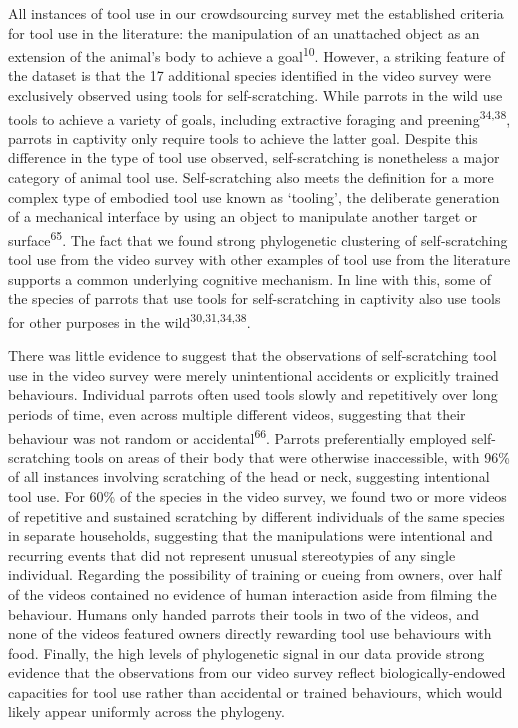 \documentclass[
  man,floatsintext]{apa6}
\begin{document}
All instances of tool use in our crowdsourcing survey met the established
criteria for tool use in the literature: the manipulation of an unattached
object as an extension of the animal's body to achieve a goal\textsuperscript{10}.
However, a striking feature of the dataset is that the 17 additional species
identified in the video survey were exclusively observed using tools for
self-scratching. While parrots in the wild use tools to achieve a variety of
goals, including extractive foraging and preening\textsuperscript{34,38},
parrots in captivity only require tools to achieve the latter goal. Despite this
difference in the type of tool use observed, self-scratching is nonetheless a
major category of animal tool use. Self-scratching also meets the definition for
a more complex type of embodied tool use known as `tooling', the deliberate
generation of a mechanical interface by using an object to manipulate another
target or surface\textsuperscript{65}. The fact that we found strong phylogenetic
clustering of self-scratching tool use from the video survey with other examples
of tool use from the literature supports a common underlying cognitive
mechanism. In line with this, some of the species of parrots that use tools for
self-scratching in captivity also use tools for other purposes in the wild\textsuperscript{30,31,34,38}.

There was little evidence to suggest that the observations of self-scratching
tool use in the video survey were merely unintentional accidents or explicitly
trained behaviours. Individual parrots often used tools slowly and repetitively
over long periods of time, even across multiple different videos, suggesting
that their behaviour was not random or accidental\textsuperscript{66}. Parrots
preferentially employed self-scratching tools on areas of their body that were
otherwise inaccessible, with 96\% of all instances involving scratching of the
head or neck, suggesting intentional tool use. For 60\% of the species in the
video survey, we found two or more videos of repetitive and sustained scratching
by different individuals of the same species in separate households, suggesting
that the manipulations were intentional and recurring events that did not
represent unusual stereotypies of any single individual. Regarding the
possibility of training or cueing from owners, over half of the videos contained
no evidence of human interaction aside from filming the behaviour. Humans only
handed parrots their tools in two of the videos, and none of the videos featured
owners directly rewarding tool use behaviours with food. Finally, the high
levels of phylogenetic signal in our data provide strong evidence that the
observations from our video survey reflect biologically-endowed capacities for
tool use rather than accidental or trained behaviours, which would likely appear
uniformly across the phylogeny.
\end{document}
